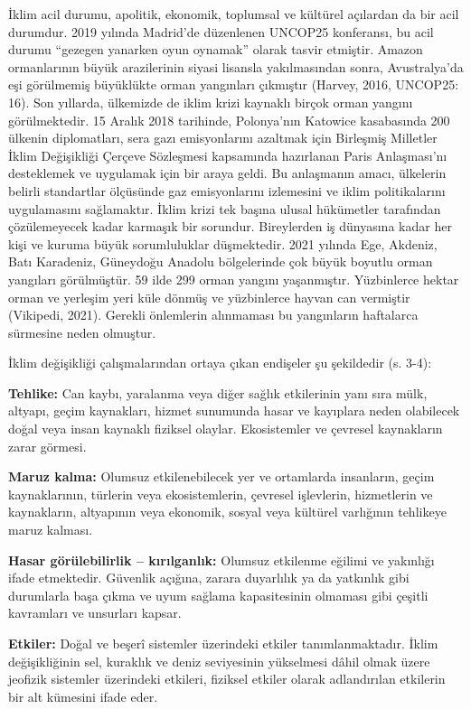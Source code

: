 \documentclass[
]{book}
\begin{document}
İklim acil durumu, apolitik, ekonomik, toplumsal ve kültürel açılardan da bir acil durumdur. 2019 yılında Madrid'de düzenlenen UNCOP25 konferansı, bu acil durumu ``gezegen yanarken oyun oynamak'' olarak tasvir etmiştir. Amazon ormanlarının büyük arazilerinin siyasi lisansla yakılmasından sonra, Avustralya'da eşi görülmemiş büyüklükte orman yangınları çıkmıştır (Harvey, 2016, UNCOP25: 16). \citep{harvey2016climate} Son yıllarda, ülkemizde de iklim krizi kaynaklı birçok orman yangını görülmektedir. 15 Aralık 2018 tarihinde, Polonya'nın Katowice kasabasında 200 ülkenin diplomatları, sera gazı emisyonlarını azaltmak için Birleşmiş Milletler İklim Değişikliği Çerçeve Sözleşmesi kapsamında hazırlanan Paris Anlaşması'nı desteklemek ve uygulamak için bir araya geldi. Bu anlaşmanın amacı, ülkelerin belirli standartlar ölçüsünde gaz emisyonlarını izlemesini ve iklim politikalarını uygulamasını sağlamaktır. İklim krizi tek başına ulusal hükümetler tarafından çözülemeyecek kadar karmaşık bir sorundur. Bireylerden iş dünyasına kadar her kişi ve kuruma büyük sorumluluklar düşmektedir. \citep{dhanda2019climate} 2021 yılında Ege, Akdeniz, Batı Karadeniz, Güneydoğu Anadolu bölgelerinde çok büyük boyutlu orman yangıları görülmüştür. 59 ilde 299 orman yangını yaşanmıştır. Yüzbinlerce hektar orman ve yerleşim yeri küle dönmüş ve yüzbinlerce hayvan can vermiştir (Vikipedi, 2021). Gerekli önlemlerin alınmaması bu yangınların haftalarca sürmesine neden olmuştur.

İklim değişikliği çalışmalarından ortaya çıkan endişeler şu şekildedir (s. 3-4): \citep{pink2018climate}

\textbf{Tehlike:} Can kaybı, yaralanma veya diğer sağlık etkilerinin yanı sıra mülk, altyapı, geçim kaynakları, hizmet sunumunda hasar ve kayıplara neden olabilecek doğal veya insan kaynaklı fiziksel olaylar. Ekosistemler ve çevresel kaynakların zarar görmesi.

\textbf{Maruz kalma:} Olumsuz etkilenebilecek yer ve ortamlarda insanların, geçim kaynaklarının, türlerin veya ekosistemlerin, çevresel işlevlerin, hizmetlerin ve kaynakların, altyapının veya ekonomik, sosyal veya kültürel varlığının tehlikeye maruz kalması.

\textbf{Hasar görülebilirlik -- kırılganlık:} Olumsuz etkilenme eğilimi ve yakınlığı ifade etmektedir. Güvenlik açığına, zarara duyarlılık ya da yatkınlık gibi durumlarla başa çıkma ve uyum sağlama kapasitesinin olmaması gibi çeşitli kavramları ve unsurları kapsar.

\textbf{Etkiler:} Doğal ve beşerî sistemler üzerindeki etkiler tanımlanmaktadır. İklim değişikliğinin sel, kuraklık ve deniz seviyesinin yükselmesi dâhil olmak üzere jeofizik sistemler üzerindeki etkileri, fiziksel etkiler olarak adlandırılan etkilerin bir alt kümesini ifade eder.
\end{document}
